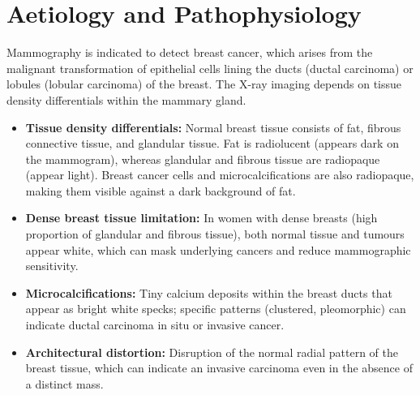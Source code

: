 \section*{Aetiology and Pathophysiology}
Mammography is indicated to detect breast cancer, which arises from the malignant transformation of epithelial cells lining the ducts (ductal carcinoma) or lobules (lobular carcinoma) of the breast. The X-ray imaging depends on tissue density differentials within the mammary gland.
\begin{itemize}
    \item \textbf{Tissue density differentials:} Normal breast tissue consists of fat, fibrous connective tissue, and glandular tissue. Fat is radiolucent (appears dark on the mammogram), whereas glandular and fibrous tissue are radiopaque (appear light). Breast cancer cells and microcalcifications are also radiopaque, making them visible against a dark background of fat.
    \item \textbf{Dense breast tissue limitation:} In women with dense breasts (high proportion of glandular and fibrous tissue), both normal tissue and tumours appear white, which can mask underlying cancers and reduce mammographic sensitivity.
    \item \textbf{Microcalcifications:} Tiny calcium deposits within the breast ducts that appear as bright white specks; specific patterns (clustered, pleomorphic) can indicate ductal carcinoma in situ or invasive cancer.
    \item \textbf{Architectural distortion:} Disruption of the normal radial pattern of the breast tissue, which can indicate an invasive carcinoma even in the absence of a distinct mass.
\end{itemize}


